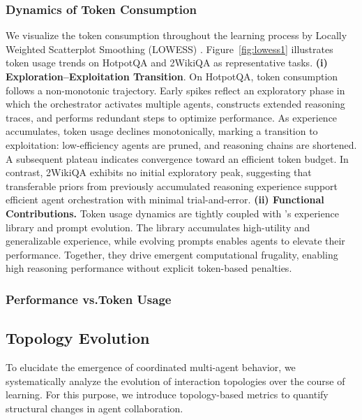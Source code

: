 \subsubsection{Dynamics of Token Consumption}
\vspace{-5pt}
\label{sec:token_train}
We visualize the token consumption throughout the learning process by Locally Weighted Scatterplot Smoothing (LOWESS) \citep{cleveland1981lowess, dang2025multi}. Figure~\ref{fig:lowess1} illustrates token usage trends on HotpotQA and 2WikiQA as representative tasks. \textbf{(i) Exploration–Exploitation Transition}. On HotpotQA, token consumption follows a non-monotonic trajectory. Early spikes reflect an exploratory phase in which the orchestrator activates multiple agents, constructs extended reasoning traces, and performs redundant steps to optimize performance. As experience accumulates, token usage declines monotonically, marking a transition to exploitation: low-efficiency agents are pruned, and reasoning chains are shortened. A subsequent plateau indicates convergence toward an efficient token budget. In contrast, 2WikiQA exhibits no initial exploratory peak, suggesting that transferable priors from previously accumulated reasoning experience support efficient agent orchestration with minimal trial-and-error. \textbf{(ii) Functional Contributions. } Token usage dynamics are tightly coupled with \hero’s experience library and prompt evolution. The library accumulates high-utility and generalizable experience, while evolving prompts enables agents to elevate their performance. Together, they drive emergent computational frugality, enabling high reasoning performance without explicit token-based penalties.
\vspace{-8pt}
\subsubsection{Performance vs.Token Usage}
\label{sec:performa_vs_token}

\vspace{-8pt}
\subsection{Topology Evolution}
\vspace{-5pt}
\label{sec:topology_analysis}
To elucidate the emergence of coordinated multi-agent behavior, we systematically analyze the evolution of interaction topologies over the course of learning. For this purpose, we introduce topology-based metrics to quantify structural changes in agent collaboration.








